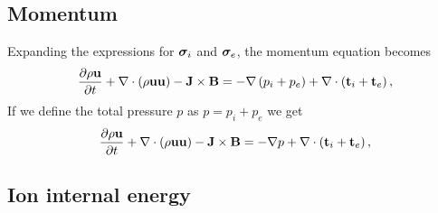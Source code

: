 \documentclass[a4paper,11pt]{report}
\begin{document}
\subsection{Momentum}

Expanding the expressions for $\bm \sigma_i$ and $\bm \sigma_e$, the momentum equation becomes
\begin{equation*}
    \frac{\partial \rho \mathbf{u}}{\partial t} + \nabla \cdot \left( \rho \mathbf{u} \mathbf{u} \right) - \mathbf{J} \times \mathbf{B} = -\nabla \left(  p_i + p_e \right) + \nabla \cdot \left(  \mathbf{t}_i + \mathbf{t}_e \right),
\end{equation*}
If we define the total pressure $p$ as $p = p_i + p_e$ we get
\begin{equation*}
    \frac{\partial \rho \mathbf{u}}{\partial t} + \nabla \cdot \left( \rho \mathbf{u} \mathbf{u} \right) - \mathbf{J} \times \mathbf{B} = -\nabla p + \nabla \cdot \left(  \mathbf{t}_i + \mathbf{t}_e \right),
\end{equation*}

\subsection{Ion internal energy}
\end{document}
